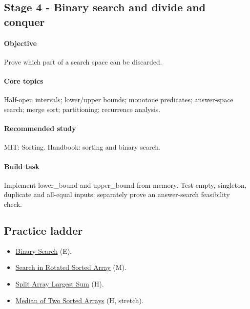 \documentclass[11pt,letterpaper]{article}
\begin{document}
\par{}
\begin{samepage}
\section{Stage 4 - Binary search and divide and conquer}\label{sec:8}

\label{stage:4}


\paragraph*{Objective}

Prove which part of a search space can be discarded.

\end{samepage}

\paragraph*{Core topics}

Half-open intervals; lower/upper bounds; monotone predicates; answer-space search; merge sort; partitioning; recurrence analysis.

\paragraph*{Recommended study}

MIT: Sorting. Handbook: sorting and binary search.

\paragraph*{Build task}

Implement lower\_bound and upper\_bound from memory. Test empty, singleton, duplicate and all-equal inputs; separately prove an answer-search feasibility check.

\subsection*{Practice ladder}

\begin{itemize}

\item \href{https://leetcode.com/problems/binary-search/}{Binary Search} (E).

\item \href{https://leetcode.com/problems/search-in-rotated-sorted-array/}{Search in Rotated Sorted Array} (M).

\item \href{https://leetcode.com/problems/split-array-largest-sum/}{Split Array Largest Sum} (H).

\item \href{https://leetcode.com/problems/median-of-two-sorted-arrays/}{Median of Two Sorted Arrays} (H, stretch).

\end{itemize}
\end{document}
